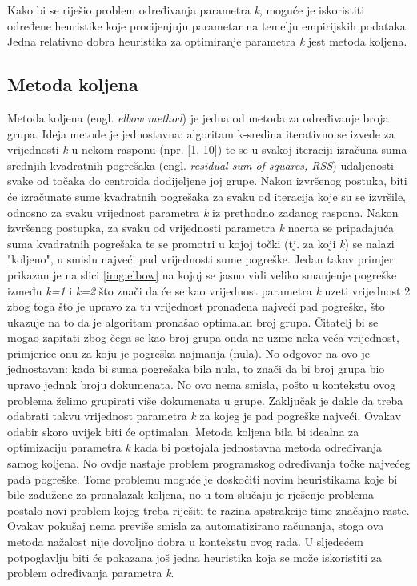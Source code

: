 \documentclass[times, utf8, zavrsni]{fer}
\begin{document}
Kako bi se riješio problem određivanja parametra \textit{k}, moguće je iskoristiti određene heuristike koje procijenjuju parametar na temelju empirijskih podataka. Jedna relativno dobra heuristika za optimiranje parametra \textit{k} jest metoda koljena.

\subsection{Metoda koljena}
Metoda koljena (engl. \textit{elbow method}) je jedna od metoda za određivanje broja grupa. Ideja metode je jednostavna: algoritam k-sredina iterativno se izvede za vrijednosti \textit{k} u nekom rasponu (npr. [1, 10]) te se u svakoj iteraciji izračuna suma srednjih kvadratnih pogrešaka (engl. \textit{residual sum of squares, RSS}) udaljenosti svake od točaka do centroida dodijeljene joj grupe. Nakon izvršenog postuka, biti će izračunate sume kvadratnih pogrešaka za svaku od iteracija koje su se izvršile, odnosno za svaku vrijednost parametra \textit{k} iz prethodno zadanog raspona. Nakon izvršenog postupka, za svaku od vrijednosti parametra \textit{k} nacrta se pripadajuća suma kvadratnih pogrešaka te se promotri u kojoj točki (tj. za koji \textit{k}) se nalazi "koljeno", u smislu najveći pad vrijednosti sume pogreške. Jedan takav primjer prikazan je na slici \ref{img:elbow} na kojoj se jasno vidi veliko smanjenje pogreške između \textit{k=1} i \textit{k=2} što znači da će se kao vrijednost parametra \textit{k} uzeti vrijednost 2 zbog toga što je upravo za tu vrijednost pronađena najveći pad pogreške, što ukazuje na to da je algoritam pronašao optimalan broj grupa. Čitatelj bi se mogao zapitati zbog čega se kao broj grupa onda ne uzme neka veća vrijednost, primjerice onu za koju je pogreška najmanja (nula). No odgovor na ovo je jednostavan: kada bi suma pogrešaka bila nula, to znači da bi broj grupa bio upravo jednak broju dokumenata. No ovo nema smisla, pošto u kontekstu ovog problema želimo grupirati više dokumenata u grupe. Zaključak je dakle da treba odabrati takvu vrijednost parametra \textit{k} za kojeg je pad pogreške najveći. Ovakav odabir skoro uvijek biti će optimalan.
Metoda koljena bila bi idealna za optimizaciju parametra \textit{k} kada bi postojala jednostavna metoda određivanja samog koljena. No ovdje nastaje problem programskog određivanja točke najvećeg pada pogreške. Tome problemu moguće je doskočiti novim heuristikama koje bi bile zadužene za pronalazak koljena, no u tom slučaju je rješenje problema postalo novi problem kojeg treba riješiti te razina apstrakcije time značajno raste. Ovakav pokušaj nema previše smisla za automatizirano računanja, stoga ova metoda nažalost nije dovoljno dobra u kontekstu ovog rada. U sljedećem potpoglavlju biti će pokazana još jedna heuristika koja se može iskoristiti za problem određivanja parametra \textit{k}.
\end{document}
